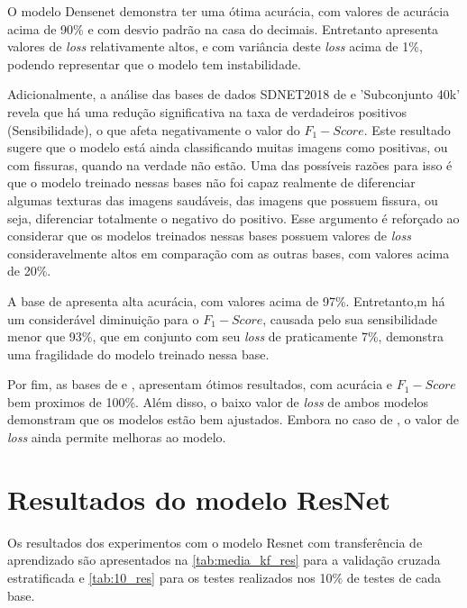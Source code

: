 O modelo Densenet demonstra ter uma ótima acurácia, com valores de acurácia acima de 90\% e com desvio padrão na casa do decimais.
Entretanto apresenta valores de \textit{loss} relativamente altos, e com variância deste \textit{loss} acima de 1\%, podendo representar que o modelo tem instabilidade.


Adicionalmente, a análise das bases de dados SDNET2018 de  e 'Subconjunto 40k' revela que há uma redução significativa na taxa de verdadeiros positivos (Sensibilidade), o que afeta negativamente o valor do $F_{1}-Score$. 
Este resultado sugere que o modelo está ainda classificando muitas imagens como positivas, ou com fissuras, quando na verdade não estão. 
Uma das possíveis razões para isso é que o modelo treinado nessas bases não foi capaz realmente de diferenciar algumas texturas das imagens saudáveis, das imagens que possuem fissura, ou seja, diferenciar totalmente o negativo do positivo.
Esse argumento é reforçado ao considerar que os modelos treinados nessas bases possuem valores de \textit{loss} consideravelmente altos  em comparação com as outras bases, com valores acima de 20\%.

A base de  apresenta alta acurácia, com valores acima de 97\%.
Entretanto,m há um considerável diminuição para o $F_{1}-Score$, causada pelo sua sensibilidade menor que 93\%, que em conjunto com seu \textit{loss} de praticamente 7\%, demonstra uma fragilidade do modelo treinado nessa base.

Por fim, as bases de  e , apresentam ótimos resultados, com acurácia e $F_{1}-Score$ bem proximos de 100\%.
Além disso, o baixo valor de \textit{loss} de ambos modelos demonstram que os modelos estão bem ajustados.
Embora no caso de , o valor de \textit{loss} ainda permite melhoras ao modelo.

\section{Resultados do modelo ResNet}

Os resultados dos experimentos com o modelo Resnet com transferência de aprendizado são apresentados na \autoref{tab:media_kf_res} para a validação cruzada estratificada e \autoref{tab:10_res} para os testes realizados nos 10\% de testes de cada base.

